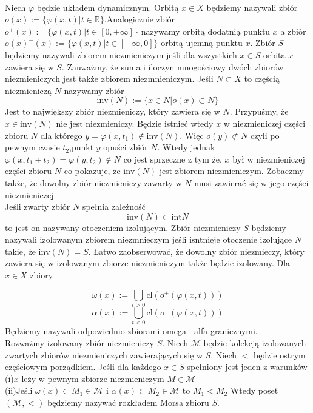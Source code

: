 \documentclass[12pt,a4paper]{article}
\begin{document}
\\Niech $\varphi$ będzie układem dynamicznym. Orbitą $x\in X$ będziemy nazywali zbiór $o(x):=\{\varphi(x,t)|t\in\mathbb{R}\}$.Analogicznie zbiór $o^+(x):=\{\varphi(x,t)|t\in [0,+\infty]\}$ nazywamy orbitą dodatnią punktu $x$ a zbiór $o(x)^-(x):=\{\varphi(x,t)|t\in[-\infty,0]\}$ orbitą ujemną punktu $x$. Zbiór $S$ będziemy nazywali zbiorem niezmieniczym jeśli dla wszystkich $x\in S$ orbita $x$ zawiera się w $S$. Zauważmy, że suma i iloczyn mnogościowy dwóch zbiorów niezmieniczych jest także zbiorem niezmnieniczym. Jeśli $N\subset X$ to częścią niezmieniczą $N$ nazywamy zbiór
$$\text{inv}(N):=\{x\in N | o(x)\subset N\}$$
Jest to największy zbiór niezmieniczy, który zawiera się w $N$. Przypuśmy, że $x\in \text{inv}(N) $ nie jest niezmieniczy. Będzie istnieć wtedy $x$ w niezmieniczej części zbioru $N$ dla którego $y=\varphi(x,t_1)\not\in\text{inv}(N)$. Więc $o(y)\not\subset{N}$ czyli po pewnym czasie $t_2$,punkt $y$ opuści zbiór $N$. Wtedy jednak $\varphi(x,t_1+t_2)=\varphi(y,t_2)\not\in N$ co jest sprzeczne z tym że, $x$ był w niezmieniczej części zbioru $N$ co pokazuje, że $\text{inv}(N)$ jest zbiorem niezmieniczym. Zobaczmy także, że dowolny zbiór niezmieniczy zawarty w $N$ musi zawierać się w jego części niezmieniczej.
\\Jeśli zwarty zbiór $N$ spełnia zależność 
$$\text{inv}(N)\subset \text{int}N$$
to jest on nazywany otoczeniem izolującym. Zbiór niezmieniczy $S$ będziemy nazywali izolowanym zbiorem niezmnieczym jeśli isntnieje otoczenie izolujące $N$ takie, że $\text{inv}(N)=S$. Łatwo zaobserwować, że dowolny zbiór niezmieczy, który zawiera się w izolowanym zbiorze niezmieniczym także będzie izolowany.
Dla $x\in X$ zbiory

$$\omega(x):=\bigcup_{t>0}\text{cl}( o^{+}(\varphi(x,t)))$$
$$\alpha(x):=\bigcup_{t<0}\text{cl}( o^{-}(\varphi(x,t)))$$
Będziemy nazywali odpowiednio zbiorami omega i alfa granicznymi.
\\Rozważmy izolowany zbiór niezmieniczy $S$. Niech $\mathcal{M}$ będzie kolekcją izolowanych zwartych zbiorów niezmieniczych zawierających się w $S$. Niech $<$ będzie ostrym częściowym porządkiem. Jeśli dla każdego $x\in S$ spełniony jest jeden z warunków
\\(i)$x$ leży w pewnym zbiorze niezmieniczym $M\in\mathcal{M}$ 
\\(ii)Jeśli $\omega(x)\subset M_1\in \mathcal{M}$ i $\alpha(x)\subset M_2\in\mathcal{M}$ to $M_1<M_2$
Wtedy poset $(\mathcal{M},<)$ będziemy nazywać rozkładem Morsa zbioru $S$.
\end{document}
